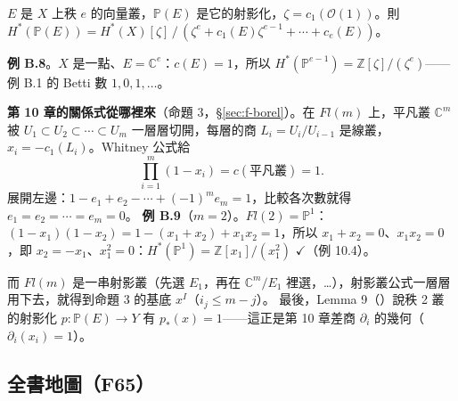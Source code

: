 \begin{thmbox}
$E$ 是 $X$ 上秩 $e$ 的向量叢，$\mathbb P(E)$ 是它的射影化，$\zeta=c_1(\mathcal O(1))$。則
$H^*(\mathbb P(E))=H^*(X)[\zeta]\,/\,(\zeta^e+c_1(E)\zeta^{e-1}+\cdots+c_e(E))$。
\end{thmbox}
\textbf{例 B.8}。$X$ 是一點、$E=\mathbb C^e$：$c(E)=1$，所以 $H^*(\mathbb P^{e-1})=\mathbb Z[\zeta]/(\zeta^e)$——例 B.1 的 Betti 數 $1,0,1,\dots$。

\textbf{第 10 章的關係式從哪裡來}（命題 3，\S\ref{sec:f-borel}）。在 $Fl(m)$ 上，平凡叢 $\mathbb C^m$ 被 $U_1\subset U_2\subset\cdots\subset U_m$ 一層層切開，每層的商 $L_i=U_i/U_{i-1}$ 是線叢，$x_i=-c_1(L_i)$。Whitney 公式給
\[
\prod_{i=1}^m(1-x_i)=c(\text{平凡叢})=1 .
\]
展開左邊：$1-e_1+e_2-\cdots+(-1)^me_m=1$，比較各次數就得 $e_1=e_2=\cdots=e_m=0$。
\textbf{例 B.9}（$m=2$）。$Fl(2)=\mathbb P^1$：$(1-x_1)(1-x_2)=1-(x_1+x_2)+x_1x_2=1$，所以 $x_1+x_2=0$、$x_1x_2=0$，即 $x_2=-x_1$、$x_1^2=0$：$H^*(\mathbb P^1)=\mathbb Z[x_1]/(x_1^2)$ $\checkmark$（例 10.4）。

而 $Fl(m)$ 是一串射影叢（先選 $E_1$，再在 $\mathbb C^m/E_1$ 裡選，…），射影叢公式一層層用下去，就得到命題 3 的基底 $x^I$（$i_j\le m-j$）。
最後，Lemma 9（）說秩 2 叢的射影化 $p:\mathbb P(E)\to Y$ 有 $p_*(x)=1$——這正是第 10 章差商 $\partial_i$ 的幾何（$\partial_i(x_i)=1$）。

\subsection{全書地圖（F65）}\label{sec:f-map}

